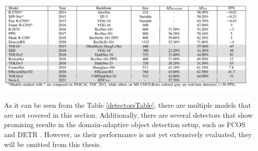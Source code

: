 \documentclass[english, 12pt, a4paper, elec, utf8, a-1b, online]{aaltothesis}
\begin{document}
\begin{table}[htb]
	\begin{center}
		\includegraphics[width=16cm]{./detectorsTable.png}
	\end{center}
	\begin{center}
		\label{detectorsTable}
	\end{center}
\end{table}
\FloatBarrier

As it can be seen from the Table \ref{detectorsTable}, there are multiple models that are not covered in this section. Additionally, there are several detectors that show promising results in the domain-adaptive object detection setup, such as FCOS \cite{Tian2019} and DETR \cite{Zhang2021b}. However, as their performance is not yet extensively evaluated, they will be omitted from this thesis. 
\end{document}
